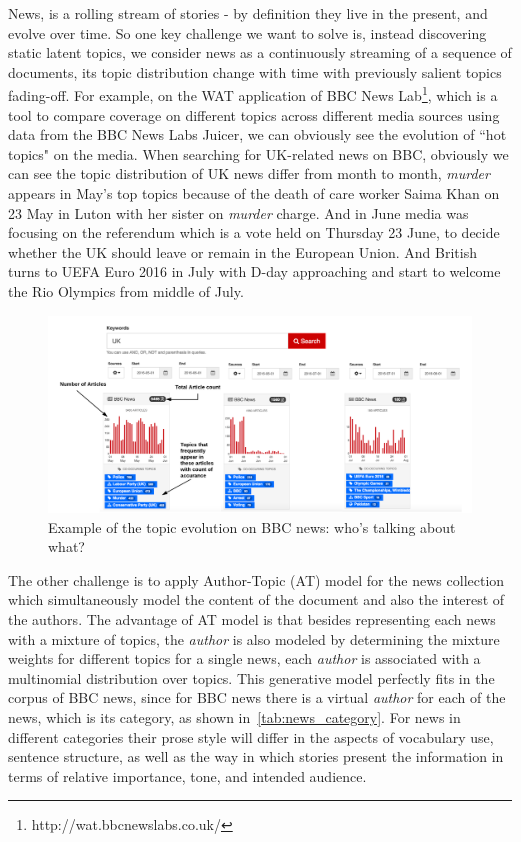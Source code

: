 News, is a rolling stream of stories - by definition they live in the present, and evolve over time. So one key challenge we want to solve is, instead discovering static latent topics, we consider news as a continuously streaming of a sequence of documents, its topic distribution change with time with previously salient topics fading-off. For example, on the WAT application of BBC News Lab\footnote{http://wat.bbcnewslabs.co.uk/}, which is a tool to compare coverage on different topics across different media sources using data from the BBC News Labs Juicer, we can obviously see the evolution of ``hot topics" on the media. When searching for UK-related news on BBC, obviously we can see the topic distribution of UK news differ from month to month, \textit{murder} appears in May's top topics because of the death of care worker Saima Khan on 23 May in Luton with her sister on \textit{murder} charge. And in June media was focusing on the referendum which is a vote held on Thursday 23 June, to decide whether the UK should leave or remain in the European Union. And British turns to UEFA Euro 2016 in July with D-day approaching and start to welcome the Rio Olympics from middle of July.
\begin{figure}[h]
\centering
\includegraphics[width=\textwidth]{figures/BBC_wat.png}
\caption{Example of the topic evolution on BBC news: who's talking about what?}
\label{fig:bbc_wat}
\end{figure}

The other challenge is to apply Author-Topic (AT) model for the news collection which simultaneously model the content of the document and also the interest of the authors. The advantage of AT model is that besides representing each news with a mixture of topics, the \textit{author} is also modeled by determining the mixture weights for different topics for a single news, each \textit{author} is associated with a multinomial distribution over topics. This generative model perfectly fits in the corpus of BBC news, since for BBC news there is a virtual \textit{author} for each of the news, which is its category, as shown in~\ref{tab:news_category}. For news in different categories their prose style will differ in the aspects of vocabulary use, sentence structure, as well as the way in which stories present the information in terms of relative importance, tone, and intended audience. 

